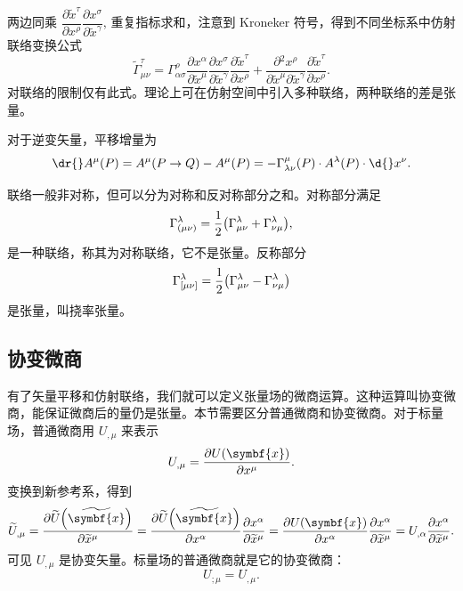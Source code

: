 \documentclass[UTF8, 12pt, a4paper, oneside, onecolumn, fontset=none]{ctexart}
\begin{document}
两边同乘 $\dfrac{\partial\widetilde{x}^{\tau}}{\partial{}x^{\rho}}\dfrac{\partial{}x^{\sigma}}{\partial\widetilde{x}^{\gamma}}$, 重复指标求和，注意到 Kroneker 符号，得到不同坐标系中仿射联络变换公式
\begin{equation}
\widetilde{\Gamma}_{\mu\nu}^{\tau}=\Gamma_{\alpha\sigma}^{\rho}\frac{\partial{}x^{\alpha}}{\partial\widetilde{x}^{\mu}}\frac{\partial{}x^{\sigma}}{\partial\widetilde{x}^{\gamma}}\frac{\partial\widetilde{x}^{\tau}}{\partial{}x^{\rho}}+\frac{\partial{}^{2}x^{\rho}}{\partial\widetilde{x}^{\mu}\partial\widetilde{x}^{\gamma}}\frac{\partial\widetilde{x}^{\tau}}{\partial{}x^{\rho}}.
\end{equation}
对联络的限制仅有此式。理论上可在仿射空间中引入多种联络，两种联络的差是张量。

对于逆变矢量，平移增量为
\begin{equation}
\dr{}A^{\mu}\mleft(P\mright)=A^{\mu}\mleft(P\to Q\mright)-A^{\mu}\mleft(P\mright)=-\Gamma_{\lambda\nu}^{\mu}\mleft(P\mright)\cdot{}A^{\lambda}\mleft(P\mright)\cdot \d{}x^{\nu}.
\end{equation}

联络一般非对称，但可以分为对称和反对称部分之和。对称部分满足
\begin{equation}
\Gamma_{\mleft(\mu\nu\mright)}^{\lambda}=\frac{1}{2}\mleft(\Gamma_{\mu\nu}^{\lambda}+\Gamma^{\lambda}_{\nu\mu}\mright),
\end{equation}
是一种联络，称其为对称联络，它不是张量。反称部分
\begin{equation}
\Gamma_{\mleft[\mu\nu\mright]}^{\lambda}=\frac{1}{2}\mleft(\Gamma_{\mu\nu}^{\lambda}-\Gamma_{\nu\mu}^{\lambda}\mright)
\end{equation}
是张量，叫挠率张量。

\subsection{协变微商}
有了矢量平移和仿射联络，我们就可以定义张量场的微商运算。这种运算叫协变微商，能保证微商后的量仍是张量。本节需要区分普通微商和协变微商。对于标量场，普通微商用 $U_{,\mu}$ 来表示
\begin{equation}
U_{,\mu}=\frac{\partial{}U\mleft(\symbf{x}\mright)}{\partial{}x^{\mu}}.
\end{equation}
变换到新参考系，得到
\begin{equation}
\widetilde{U}_{,\mu}=\frac{\partial\widetilde{U}\mleft(\widetilde{\symbf{x}}\mright)}{\partial\widetilde{x}^{\mu}}=\frac{\partial\widetilde{U}\mleft(\widetilde{\symbf{x}}\mright)}{\partial{}x^{\alpha}}\frac{\partial{}x^{\alpha}}{\partial\widetilde{x}^{\mu}}=\frac{\partial{}U\mleft(\symbf{x}\mright)}{\partial{}x^{\alpha}}\frac{\partial{}x^{\alpha}}{\partial\widetilde{x}^{\mu}}=U_{,\alpha}\frac{\partial{}x^{\alpha}}{\partial\widetilde{x}^{\mu}}.
\end{equation}
可见 $U_{,\mu}$ 是协变矢量。标量场的普通微商就是它的协变微商：
\begin{equation}
U_{;\mu}=U_{,\mu}.
\end{equation}
\end{document}
